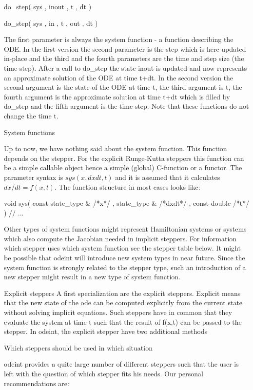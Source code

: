 do\_step( sys , inout , t , dt ) 

do\_step( sys , in , t , out , dt ) 

The first parameter is always the system function - a function describing the ODE. In the first version the second parameter is the step which is here updated in-place and the third and the fourth parameters are the time and step size (the time step). After a call to do\_step the state inout is updated and now represents an approximate solution of the ODE at time t+dt. In the second version the second argument is the state of the ODE at time t, the third argument is t, the fourth argument is the approximate solution at time t+dt which is filled by do\_step and the fifth argument is the time step. Note that these functions do not change the time t. 

System functions 

Up to now, we have nothing said about the system function. This function depends on the stepper. For the explicit Runge-Kutta steppers this function can be a simple callable object hence a simple (global) C-function or a functor. The parameter syntax is $sys( x , dxdt , t )$ and it is assumed that it calculates $dx/dt = f(x,t)$. The function structure in most cases looks like: 


void sys( const state\_type \& /*x*/ , state\_type \& /*dxdt*/ , const double /*t*/ )
{
	// ...
}


Other types of system functions might represent Hamiltonian systems or systems which also compute the Jacobian needed in implicit steppers. For information which stepper uses which system function see the stepper table below. It might be possible that odeint will introduce new system types in near future. Since the system function is strongly related to the stepper type, such an introduction of a new stepper might result in a new type of system function. 

Explicit steppers 
A first specialization are the explicit steppers. Explicit means that the new state of the ode can be computed explicitly from the current state without solving implicit equations. Such steppers have in common that they evaluate the system at time t such that the result of f(x,t) can be passed to the stepper. In odeint, the explicit stepper have two additional methods 


Which steppers should be used in which situation 

odeint provides a quite large number of different steppers such that the user is left with the question of which stepper fits his needs. Our personal recommendations are: 

